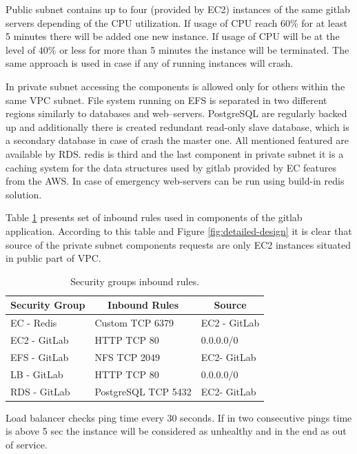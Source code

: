 	Public subnet contains up to four (provided by \gls{EC2}) instances of the same \gls{gitlab} servers depending of the CPU utilization. If usage of CPU reach $60\%$ for at least 5 minutes there will be added one new instance. If usage of CPU will be at the level of $40\%$ or less for more than 5 minutes the instance will be terminated. The same approach is used in case if any of running instances will crash.
	
	In private subnet accessing the components is allowed only for others within the same \gls{VPC} subnet. File system running on \gls{EFS} is separated in two different regions similarly to databases and web--servers. PostgreSQL are regularly backed up and additionally there is created redundant read-only slave database, which is a secondary database in case of crash the master one. All mentioned featured are available by \gls{RDS}. \gls{redis} is third and the last component in private subnet it is a caching system for the data structures used by \gls{gitlab} provided by \gls{EC} features from the \gls{AWS}. In case of emergency web-servers can be run using build-in \gls{redis} solution.
	
	Table \ref{tab:security-groups} presents set of inbound rules used in components of the \gls{gitlab} application. According to this table and Figure \ref{fig:detailed-design} it is clear that source of the private subnet components requests are only \gls{EC2} instances situated in public part of \gls{VPC}.
	\begin{table}[!htbp]
		\centering
		\caption{Security groups inbound rules.}
		\label{tab:security-groups}
		\begin{tabular}{|l|l|l|}
			\hline
			\multicolumn{1}{|c|}{\textbf{Security Group}} & \multicolumn{1}{c|}{\textbf{Inbound Rules}} & \multicolumn{1}{c|}{\textbf{Source}} \\ \hline
			EC - Redis & Custom TCP 6379 & EC2 - GitLab \\ \hline
			EC2 - GitLab & HTTP TCP 80 & 0.0.0.0/0 \\ \hline
			EFS - GitLab & NFS TCP 2049 & EC2- GitLab \\ \hline
			LB - GitLab & HTTP TCP 80 & 0.0.0.0/0 \\ \hline
			RDS - GitLab & PostgreSQL TCP 5432 & EC2- GitLab \\ \hline
		\end{tabular}
	\end{table}
	
	Load balancer checks ping time every $30$ seconds. If in two consecutive pings time is above 5 sec the instance will be considered as unhealthy and in the end as out of service.
	
